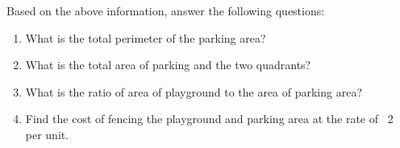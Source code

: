 \begin{enumerate}
Based on the above information, answer the following questions:
\begin{enumerate}
    \item What is the total perimeter of the parking area?
    \item What is the total area of parking and the two quadrants?
    \item What is the ratio of area of playground to the area of parking area?
    \item Find the cost of fencing the playground and parking area at the rate of \rupee~2 per unit.
\end{enumerate}
    \end{enumerate}
%
